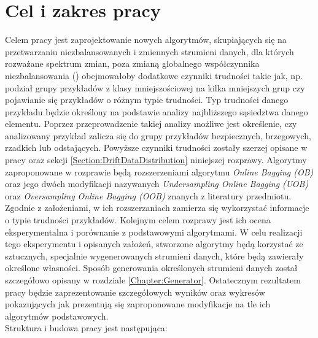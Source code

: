 \chapter{Cel i zakres pracy}

\noindent Celem pracy jest zaprojektowanie nowych algorytmów, skupiających się na przetwarzaniu niezbalansowanych i zmiennych strumieni danych, dla których rozważane spektrum zmian, poza zmianą globalnego współczynnika niezbalansowania () obejmowałoby dodatkowe czynniki trudności takie jak, np. podział grupy przykładów z klasy mniejszościowej na kilka mniejszych grup czy pojawianie się przykładów o różnym typie trudności. Typ trudności danego przykładu będzie określony na podstawie analizy najbliższego sąsiedztwa danego elementu. Poprzez przeprowadzenie takiej analizy możliwe jest określenie, czy analizowany przykład zalicza się do grupy przykładów bezpiecznych, brzegowych, rzadkich lub odstających. Powyższe czynniki trudności zostały szerzej opisane w pracy \cite{Article:TypyPrzykladow} oraz sekcji \ref{Section:DriftDataDistribution} niniejszej rozprawy. Algorytmy zaproponowane w rozprawie będą rozszerzeniami algorytmu \textit{Online Bagging (OB)} oraz jego dwóch modyfikacji nazywanych \textit{Undersampling Online Bagging (UOB)} oraz \textit{Oversampling Online Bagging (OOB)} znanych z literatury przedmiotu. Zgodnie z założeniami, w ich rozszerzaniach zamierza się wykorzystać informacje o typie trudności przykładów. Kolejnym celem rozprawy jest ich ocena eksperymentalna i porównanie z podstawowymi algorytmami. W celu realizacji tego eksperymentu i opisanych założeń, stworzone algorytmy będą korzystać ze sztucznych, specjalnie wygenerowanych strumieni danych, które będą zawierały określone własności. Sposób generowania określonych strumieni danych został szczegółowo opisany w rozdziale \ref{Chapter:Generator}. Ostatecznym rezultatem pracy będzie zaprezentowanie szczegółowych wyników oraz wykresów pokazujących jak prezentują się zaproponowane modyfikacje na tle ich algorytmów podstawowych.\\

\noindent Struktura i budowa pracy jest następująca:

